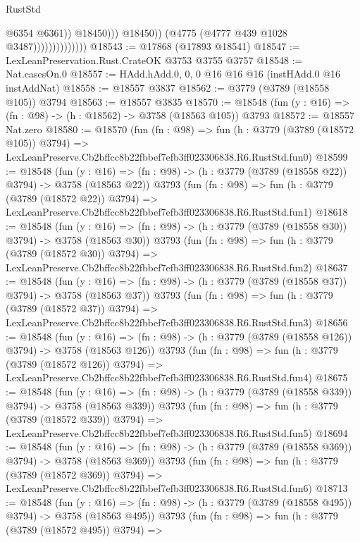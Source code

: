 \begin{lexlean}{RustStd}
\begin{coremodule}
                                          @6354
                                          @6361))
                                      @18450)))
                                @18450))
                            (@4775 (@4777 @439 @1028 @3487))))))))))))))
@18543 := @17868 (@17893 @18541)
@18547 := LexLeanPreservation.Rust.CrateOK @3753 @3755 @3757
@18548 := Nat.casesOn.{0}
@18557 := HAdd.hAdd.{0, 0, 0} @16 @16 @16 (instHAdd.{0} @16 instAddNat)
@18558 := @18557 @3837
@18562 := @3779 (@3789 (@18558 @105)) @3794
@18563 := @18557 @3835
@18570 := @18548 (fun (y : @16) => (fn : @98) -> (h : @18562) -> @3758 (@18563 @105)) @3793
@18572 := @18557 Nat.zero
@18580 := @18570
    (fun (fn : @98) =>
    fun (h : @3779 (@3789 (@18572 @105)) @3794) =>
    LexLeanPreserve.Cb2bffcc8b22fbbef7efb3ff023306838.R6.RustStd.fun0)
@18599 := @18548
    (fun (y : @16) => (fn : @98) -> (h : @3779 (@3789 (@18558 @22)) @3794) -> @3758 (@18563 @22))
    @3793
    (fun (fn : @98) =>
    fun (h : @3779 (@3789 (@18572 @22)) @3794) =>
    LexLeanPreserve.Cb2bffcc8b22fbbef7efb3ff023306838.R6.RustStd.fun1)
@18618 := @18548
    (fun (y : @16) => (fn : @98) -> (h : @3779 (@3789 (@18558 @30)) @3794) -> @3758 (@18563 @30))
    @3793
    (fun (fn : @98) =>
    fun (h : @3779 (@3789 (@18572 @30)) @3794) =>
    LexLeanPreserve.Cb2bffcc8b22fbbef7efb3ff023306838.R6.RustStd.fun2)
@18637 := @18548
    (fun (y : @16) => (fn : @98) -> (h : @3779 (@3789 (@18558 @37)) @3794) -> @3758 (@18563 @37))
    @3793
    (fun (fn : @98) =>
    fun (h : @3779 (@3789 (@18572 @37)) @3794) =>
    LexLeanPreserve.Cb2bffcc8b22fbbef7efb3ff023306838.R6.RustStd.fun3)
@18656 := @18548
    (fun (y : @16) => (fn : @98) -> (h : @3779 (@3789 (@18558 @126)) @3794) -> @3758 (@18563 @126))
    @3793
    (fun (fn : @98) =>
    fun (h : @3779 (@3789 (@18572 @126)) @3794) =>
    LexLeanPreserve.Cb2bffcc8b22fbbef7efb3ff023306838.R6.RustStd.fun4)
@18675 := @18548
    (fun (y : @16) => (fn : @98) -> (h : @3779 (@3789 (@18558 @339)) @3794) -> @3758 (@18563 @339))
    @3793
    (fun (fn : @98) =>
    fun (h : @3779 (@3789 (@18572 @339)) @3794) =>
    LexLeanPreserve.Cb2bffcc8b22fbbef7efb3ff023306838.R6.RustStd.fun5)
@18694 := @18548
    (fun (y : @16) => (fn : @98) -> (h : @3779 (@3789 (@18558 @369)) @3794) -> @3758 (@18563 @369))
    @3793
    (fun (fn : @98) =>
    fun (h : @3779 (@3789 (@18572 @369)) @3794) =>
    LexLeanPreserve.Cb2bffcc8b22fbbef7efb3ff023306838.R6.RustStd.fun6)
@18713 := @18548
    (fun (y : @16) => (fn : @98) -> (h : @3779 (@3789 (@18558 @495)) @3794) -> @3758 (@18563 @495))
    @3793
    (fun (fn : @98) =>
    fun (h : @3779 (@3789 (@18572 @495)) @3794) =>

\end{coremodule}
\end{lexlean}
